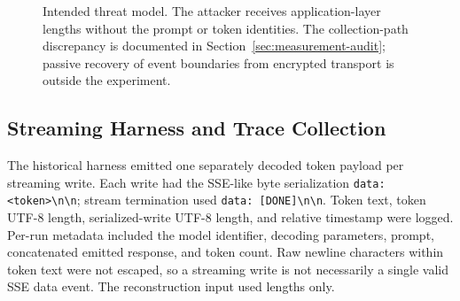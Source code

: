 \documentclass[electronics,article,submit,pdftex,moreauthors]{Definitions/mdpi}
\begin{document}
\begin{figure}[ht]
\centering
{}
\caption{Intended threat model. The attacker receives application-layer lengths without the prompt or token identities. The collection-path discrepancy is documented in Section~\ref{sec:measurement-audit}; passive recovery of event boundaries from encrypted transport is outside the experiment.}
\label{fig:threat_model}
\end{figure}

\subsection{Streaming Harness and Trace Collection}
The historical harness emitted one separately decoded token payload per streaming write. Each write had the SSE-like byte serialization \texttt{data: \textless token\textgreater\textbackslash n\textbackslash n}; stream termination used \texttt{data: [DONE]\textbackslash n\textbackslash n}. Token text, token UTF-8 length, serialized-write UTF-8 length, and relative timestamp were logged. Per-run metadata included the model identifier, decoding parameters, prompt, concatenated emitted response, and token count. Raw newline characters within token text were not escaped, so a streaming write is not necessarily a single valid SSE data event. The reconstruction input used lengths only.
\end{document}
